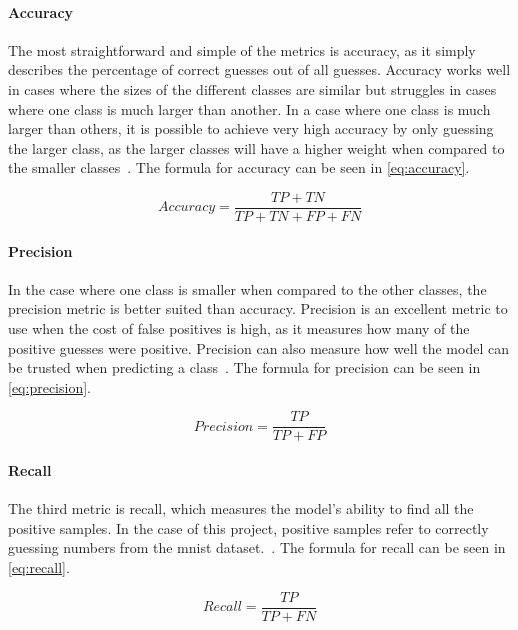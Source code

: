 \paragraph{Accuracy} The most straightforward and simple of the metrics is accuracy, as it simply describes the percentage of correct guesses out of all guesses. Accuracy works well in cases where the sizes of the different classes are similar but struggles in cases where one class is much larger than another. In a case where one class is much larger than others, it is possible to achieve very high accuracy by only guessing the larger class, as the larger classes will have a higher weight when compared to the smaller classes~\cite{metrics-for-multi}. The formula for accuracy can be seen in \autoref{eq:accuracy}.

\begin{equation}
    Accuracy = \frac{TP + TN}{TP + TN + FP + FN}\label{eq:accuracy}
\end{equation}

\paragraph{Precision} In the case where one class is smaller when compared to the other classes, the precision metric is better suited than accuracy. Precision is an excellent metric to use when the cost of false positives is high, as it measures how many of the positive guesses were positive. Precision can also measure how well the model can be trusted when predicting a class~\cite{metrics-for-multi}. The formula for precision can be seen in \autoref{eq:precision}.

\begin{equation}
    Precision = \frac{TP}{TP + FP}\label{eq:precision}
\end{equation}

\paragraph{Recall} The third metric is recall, which measures the model's ability to find all the positive samples. In the case of this project, positive samples refer to correctly guessing numbers from the \gls{mnist} dataset.~\cite{metrics-for-multi}. The formula for recall can be seen in \autoref{eq:recall}.

\begin{equation}
    Recall = \frac{TP}{TP + FN}\label{eq:recall}
\end{equation}

